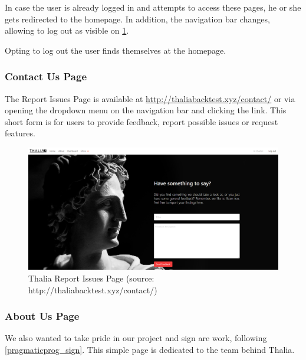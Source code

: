 \documentclass[main.tex]{subfiles}
\begin{document}
In case the user is already logged in and attempts to access these pages, he or she gets redirected to the homepage. In addition, the navigation bar changes, allowing to log out as visible on \figurename{\ref{thalia_issues}}.

Opting to log out the user finds themselves at the homepage.



\subsubsection{Contact Us Page}



The Report Issues Page is available at \url{http://thaliabacktest.xyz/contact/} or via opening the dropdown menu on the navigation bar and clicking the link. This short form is for users to provide feedback, report possible issues or request features.



\begin{figure}[H]

   \centering

   \includegraphics[width=\textwidth]{08Appendices/081User/081Pictures/issues.png}

   \caption{Thalia Report Issues Page (source: http://thaliabacktest.xyz/contact/)}

   \label{thalia_issues}

\end{figure}



\subsubsection{About Us Page}



We also wanted to take pride in our project and sign are work, following \ref{pragmaticprog_sign}. This simple page is dedicated to the team behind Thalia.
\end{document}
